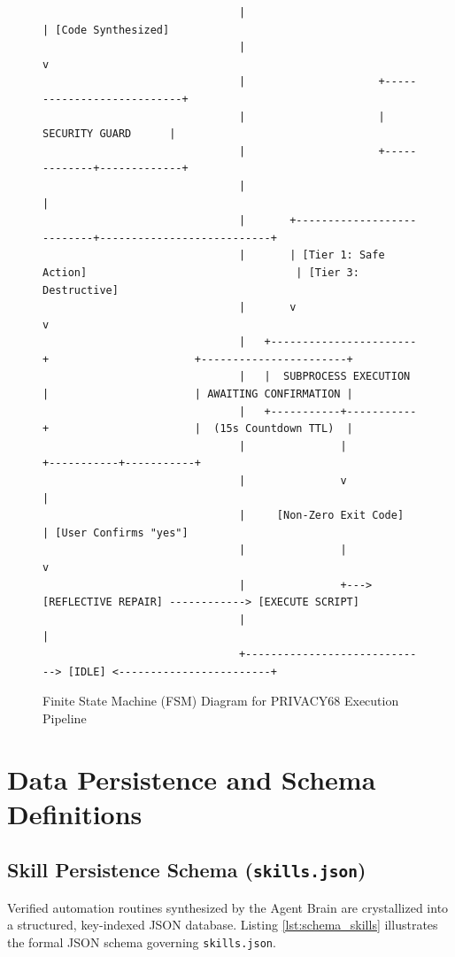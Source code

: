 \begin{figure}[htbp]
{\begin{verbatim}
                               |                                 | [Code Synthesized]
                               |                                 v
                               |                     +---------------------------+
                               |                     |       SECURITY GUARD      |
                               |                     +-------------+-------------+
                               |                                   |
                               |       +---------------------------+---------------------------+
                               |       | [Tier 1: Safe Action]                                 | [Tier 3: Destructive]
                               |       v                                                       v
                               |   +-----------------------+                       +-----------------------+
                               |   |  SUBPROCESS EXECUTION |                       | AWAITING CONFIRMATION |
                               |   +-----------+-----------+                       |  (15s Countdown TTL)  |
                               |               |                                   +-----------+-----------+
                               |               v                                               |
                               |     [Non-Zero Exit Code]                                      | [User Confirms "yes"]
                               |               |                                               v
                               |               +---> [REFLECTIVE REPAIR] ------------> [EXECUTE SCRIPT]
                               |                                                               |
                               +-----------------------------> [IDLE] <------------------------+
\end{verbatim}
}
\caption{Finite State Machine (FSM) Diagram for PRIVACY68 Execution Pipeline}
\label{fig:state_machine}
\end{figure}

\section{Data Persistence and Schema Definitions}

\subsection{Skill Persistence Schema (\texttt{skills.json})}
Verified automation routines synthesized by the Agent Brain are crystallized into a structured, key-indexed JSON database. Listing \ref{lst:schema_skills} illustrates the formal JSON schema governing \texttt{skills.json}.

